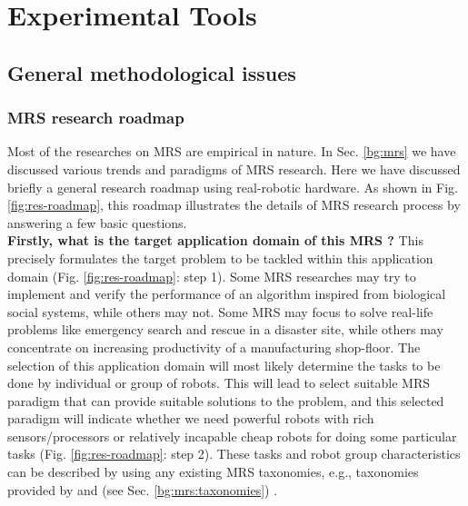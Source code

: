 \chapter{Experimental Tools}
\section{General methodological issues}
\subsection{MRS research roadmap}
\label{expt-tools:mrs-design}
Most of the researches on MRS are empirical in nature. In Sec. \ref{bg:mrs} we have discussed various  trends and paradigms of MRS research. Here we have discussed briefly a general research roadmap using real-robotic hardware.  As shown in Fig. \ref{fig:res-roadmap}, this roadmap illustrates the details of MRS research process by answering a few basic questions.\\
\textbf{Firstly, what is the target application domain of this MRS ?} This precisely formulates the target problem to be tackled within this application domain (Fig. \ref{fig:res-roadmap}: step 1). Some MRS researches may try to implement and verify the performance of an algorithm inspired from biological social systems, while others may not. Some MRS may focus to solve real-life problems like emergency search and rescue in a disaster site, while others may concentrate on increasing productivity of a manufacturing shop-floor. The selection of this application domain will most likely determine the tasks to be done by individual or group of robots. This will lead to select suitable MRS paradigm that can provide suitable solutions to the problem, and this selected paradigm will indicate whether we need powerful  robots with rich sensors/processors or relatively incapable cheap robots for doing some particular tasks (Fig. \ref{fig:res-roadmap}: step 2). These tasks and robot group characteristics can be described by using any existing MRS taxonomies, e.g., taxonomies provided by \cite{Gerkey+2004} and \cite{Dudek+1996} (see Sec. \ref{bg:mrs:taxonomies}) .\\ 
